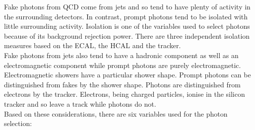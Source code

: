 Fake photons from QCD come from jets and so tend to have plenty of activity in
the surrounding detectors. In contrast, prompt photons tend to be isolated with
little surrounding activity. Isolation is one of the variables used to select 
photons because of its background rejection power. There are three independent 
isolation measures based on the ECAL, the HCAL and the tracker. \\

Fake photons from jets also tend to have a hadronic component as well as an
electromagnetic component while prompt photons are purely electromagnetic.
Electromagnetic showers have a particular shower shape. Prompt photons can be 
distinguished from fakes by the shower shape. Photons are distinguished from 
electrons by the tracker. Electrons, being charged particles, ionise in the 
silicon tracker and so leave a track while photons do not. \\ 

Based on these considerations, there are six variables used for the photon 
selection:

